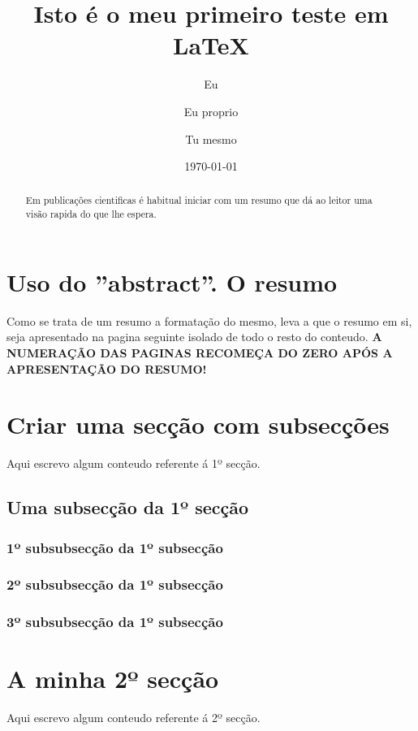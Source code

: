 \documentclass[a4paper,11pt]{report}%
\author {Eu \and Eu proprio \and Tu mesmo}
\title {Isto é o meu primeiro teste em \LaTeX}
\date {\today}%
\begin{document}

\maketitle
\tableofcontents %

\newpage
\section{Uso do ''abstract''. O resumo}
Como se trata de um resumo a formatação do mesmo, leva a que o resumo em si, seja apresentado na pagina seguinte isolado de todo o resto do conteudo. \textbf{ A NUMERAÇÃO DAS PAGINAS RECOMEÇA DO ZERO APÓS A APRESENTAÇÃO DO RESUMO!}
\begin{abstract}
Em publicações cientificas é habitual iniciar com um resumo que dá ao leitor uma visão rapida do que lhe espera.
\end{abstract}

\newpage
\section {Criar uma secção com subsecções}
Aqui escrevo algum conteudo referente á 1º secção.
\subsection {Uma subsecção da 1º secção}
\subsubsection {1º subsubsecção da 1º subsecção}
\subsubsection {2º subsubsecção da 1º subsecção}
\subsubsection {3º subsubsecção da 1º subsecção}
\section {A minha 2º secção}
Aqui escrevo algum conteudo referente á 2º secção.
\end{document}
